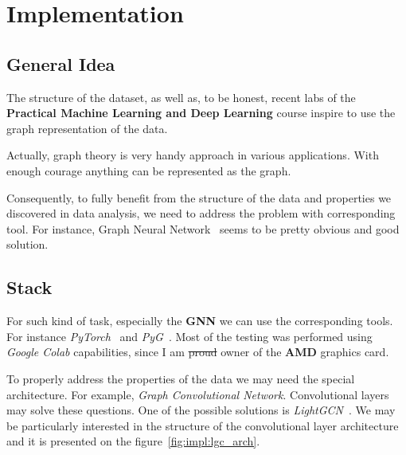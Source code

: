\section{Implementation}

\subsection{General Idea}

The structure of the dataset, as well as, to be honest, recent labs of the
\textbf{Practical Machine Learning and Deep Learning} course inspire to use the
graph representation of the data.

Actually, graph theory is very handy approach in various applications. With
enough courage anything can be represented as the graph.

Consequently, to fully benefit from the structure of the data and properties we
discovered in data analysis, we need to address the problem with corresponding
tool. For instance, Graph Neural Network~\cite{zhouGraphNeuralNetworks2020}
seems to be pretty obvious and good solution.

\subsection{Stack}

For such kind of task, especially the \textbf{GNN} we can use the corresponding
tools. For instance \textit{PyTorch}~\cite{PyTorch} and
\textit{PyG}~\cite{PyG}. Most of the testing was performed using \textit{Google
    Colab} capabilities, since I am \sout{proud} owner of the \textbf{AMD} graphics
card.

To properly address the properties of the data we may need the special
architecture. For example, \textit{Graph Convolutional Network}. Convolutional
layers may solve these questions. One of the possible solutions is
\textit{LightGCN}~\cite{heLightGCNSimplifyingPowering2020}. We may be
particularly interested in the structure of the convolutional layer
architecture and it is presented on the figure~\ref{fig:impl:lgc_arch}.

